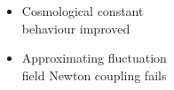 \documentclass[]{beamer}  %
\begin{document}
\begin{frame}
\begin{columns}[T]
    \hspace{-30pt}
    \begin{column}{.4\textwidth}
      \vspace{10pt}
      \begin{center}
        \begin{itemize}
          \item
            Cosmological constant\\
            behaviour improved
          \item
            Approximating fluctuation\\
            field Newton coupling fails
        \end{itemize}
      \end{center}
    \end{column}
  \end{columns}
\end{frame}


\end{document}
